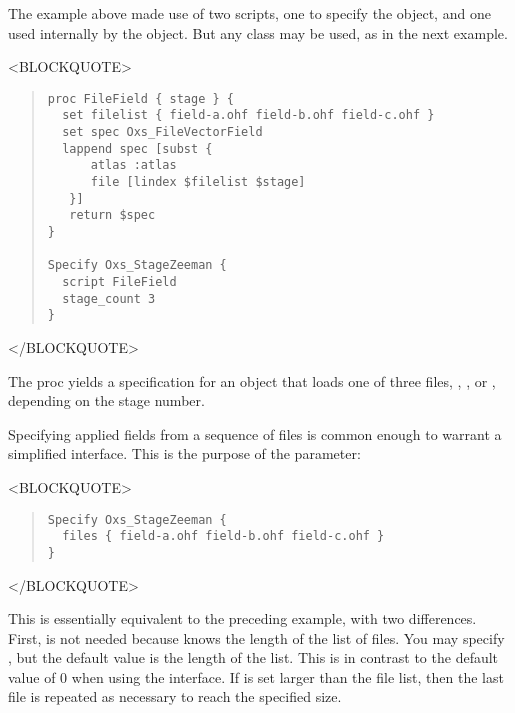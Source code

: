 \begin{description}
   The example above made use of two scripts, one to specify the
    object, and one used internally by the
    object.  But any 
   class may be used, as in the next example.
\begin{rawhtml}
<BLOCKQUOTE>
\end{rawhtml}
\begin{quote}
\begin{verbatim}
proc FileField { stage } {
  set filelist { field-a.ohf field-b.ohf field-c.ohf }
  set spec Oxs_FileVectorField
  lappend spec [subst {
      atlas :atlas
      file [lindex $filelist $stage]
   }]
   return $spec
}

Specify Oxs_StageZeeman {
  script FileField
  stage_count 3
}
\end{verbatim}
\end{quote}
\begin{rawhtml}
</BLOCKQUOTE>
\end{rawhtml}
   The  proc yields a specification for an
    object that loads one of three files,
   , , or , depending on
   the stage number.

   Specifying applied fields from a sequence of files is common enough
   to warrant a simplified interface.  This is the purpose of the
    parameter:
\begin{rawhtml}
<BLOCKQUOTE>
\end{rawhtml}
\begin{quote}
\begin{verbatim}
Specify Oxs_StageZeeman {
  files { field-a.ohf field-b.ohf field-c.ohf }
}
\end{verbatim}
\end{quote}
\begin{rawhtml}
</BLOCKQUOTE>
\end{rawhtml}
   This is essentially equivalent to the preceding example, with two
   differences.  First,  is not needed because
    knows the length of the list of files.  You may
   specify , but the default value is the length of the
    list.  This is in contrast to the default value
   of 0 when using the  interface.  If  is
   set larger than the file list, then the last file is repeated as
   necessary to reach the specified size.


\end{description}
